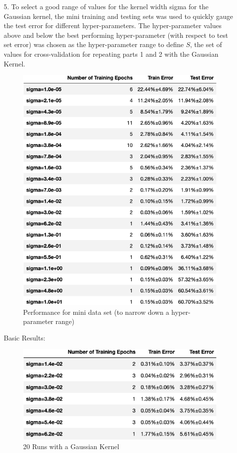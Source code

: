 \documentclass[12pt]{article}
\begin{document}
\begin{itemize}
    \item[5.] To select a good range of values for the kernel width sigma for the Gaussian kernel, the mini training and testing sets was used to quickly gauge the test error for different hyper-parameters.
    The hyper-parameter values above and below the best performing hyper-parameter (with respect to test set error) was chosen as the hyper-parameter range to define $S$, the set of values for cross-validation for repeating parts 1 and 2 with the Gaussian Kernel.
    \begin{figure}[h]
    \centering
    \includegraphics[scale=0.5]{outputs/part1/q5_1-mini.png}
    \caption{Performance for mini data set (to narrow down a hyper-parameter range)}
    \label{fig:7}
    \end{figure}
    \newpage

    Basic Results:

    \begin{figure}[h]
    \centering
    \includegraphics[scale=0.5]{outputs/part1/q5_1.png}
    \caption{20 Runs with a Gaussian Kernel}
    \label{fig:8}
    \end{figure}



\end{itemize}
\end{document}
